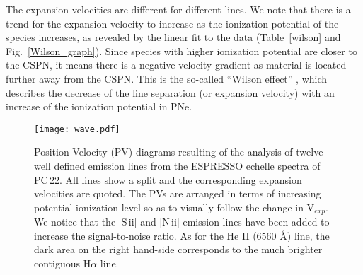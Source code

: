 \documentclass[fleqn,usenatbib,useAMS]{mnras}
\begin{document}
The expansion velocities are different for different lines.
We note that there is a trend for the expansion velocity to increase
as the ionization potential of the species increases, as
revealed by the linear fit to the data (Table~\ref{wilson} and
Fig.~\ref{Wilson_graph}).
Since species with higher ionization potential are closer to the CSPN, it
means there is a negative velocity gradient as material is located further
away from the CSPN.
This is the so-called ``Wilson effect'' \citep{Wilson1950}, which describes
the decrease of the line separation (or expansion velocity) with an
increase of the ionization potential in PNe.







\begin{figure*}
\begin{center}
\advance\leftskip-1cm
\texttt{[image: wave.pdf]}
\vspace{-1cm}
\caption{
Position-Velocity (PV) diagrams resulting of the analysis of twelve well 
defined emission lines from the ESPRESSO echelle spectra of PC\,22.
All lines show a split and the corresponding expansion velocities are quoted.
The PVs are arranged in terms of increasing potential ionization level so
as to visually follow the change in V$_{exp}$.  
We notice that the [S\,{\sc ii}] and [N\,{\sc ii}] emission lines have
been added to increase the signal-to-noise ratio.
As for the He II (6560 \AA) line, the dark area on the right hand-side
corresponds to the much brighter contiguous H$\alpha$ line.
}
\label{vel_gauss1}
\end{center}
\end{figure*}
\end{document}
